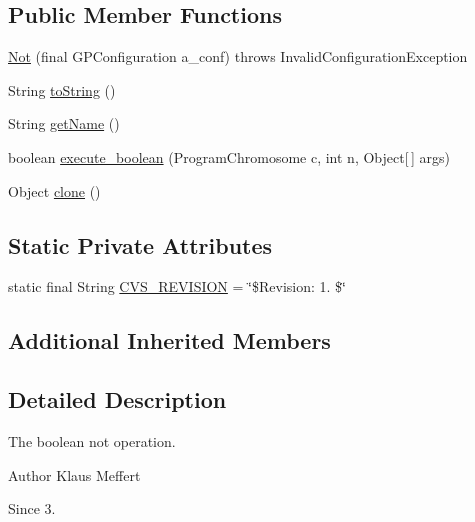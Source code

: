 \subsection*{Public Member Functions}
\begin{DoxyCompactItemize}
\item 
\hyperlink{classorg_1_1jgap_1_1gp_1_1function_1_1_not_acb8f24a15ccccbb04b5d8c936967e518}{Not} (final G\-P\-Configuration a\-\_\-conf)  throws Invalid\-Configuration\-Exception 
\item 
String \hyperlink{classorg_1_1jgap_1_1gp_1_1function_1_1_not_a12b2a18948304e5c67c2abf3a0e4d2b3}{to\-String} ()
\item 
String \hyperlink{classorg_1_1jgap_1_1gp_1_1function_1_1_not_a77d6343e5ec4ab33e587beeb4172d82d}{get\-Name} ()
\item 
boolean \hyperlink{classorg_1_1jgap_1_1gp_1_1function_1_1_not_a58d9420aca2775a098e94bbd6ac7a722}{execute\-\_\-boolean} (Program\-Chromosome c, int n, Object\mbox{[}$\,$\mbox{]} args)
\item 
Object \hyperlink{classorg_1_1jgap_1_1gp_1_1function_1_1_not_a1eb1f943ccc2628b099190963ef7ce96}{clone} ()
\end{DoxyCompactItemize}
\subsection*{Static Private Attributes}
\begin{DoxyCompactItemize}
\item 
static final String \hyperlink{classorg_1_1jgap_1_1gp_1_1function_1_1_not_aa7d445c3322eddd97574bce1cbd132bd}{C\-V\-S\-\_\-\-R\-E\-V\-I\-S\-I\-O\-N} = \char`\"{}\$Revision\-: 1. \$\char`\"{}
\end{DoxyCompactItemize}
\subsection*{Additional Inherited Members}


\subsection{Detailed Description}
The boolean not operation.

\begin{DoxyAuthor}{Author}
Klaus Meffert 
\end{DoxyAuthor}
\begin{DoxySince}{Since}
3. 
\end{DoxySince}



